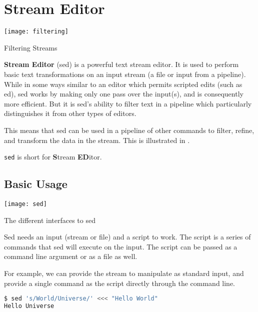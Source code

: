 \chapter{Stream Editor}

\begin{marginfigure}
  \texttt{[image: filtering]}
  \caption{Filtering Streams}
\end{marginfigure}

\textbf{Stream Editor} (sed) is a powerful text stream editor. It is used to perform basic text transformations on an input stream (a file or input from a pipeline). While in some ways similar to an editor which permits scripted edits (such as ed), sed works by making only one pass over the input(s), and is consequently more efficient. But it is sed's ability to filter text in a pipeline which particularly distinguishes it from other types of editors.

This means that sed can be used in a pipeline of other commands to filter, refine, and transform the data in the stream. This is illustrated in .

\begin{remark}
\lstinline|sed| is short for \textbf{S}tream \textbf{ED}itor.
\end{remark}

\section{Basic Usage}

\begin{marginfigure}[-3cm]
\texttt{[image: sed]}
\caption{The different interfaces to sed}
\end{marginfigure}

Sed needs an input (stream or file) and a script to work. The script is a series of commands that sed will execute on the input. The script can be passed as a command line argument or as a file as well.

For example, we can provide the stream to manipulate as standard input, and provide a single command as the script directly through the command line.

\begin{lstlisting}[language=bash]
$ sed 's/World/Universe/' <<< "Hello World"
Hello Universe
\end{lstlisting}

